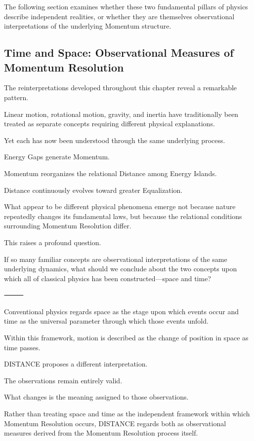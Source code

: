 The following section examines whether these two fundamental pillars of physics describe independent realities, or whether they are themselves observational interpretations of the underlying Momentum structure.

\subsection*{\textbf{Time and Space: Observational Measures of Momentum Resolution}}

The reinterpretations developed throughout this chapter reveal a remarkable pattern.

Linear motion, rotational motion, gravity, and inertia have traditionally been treated as separate concepts requiring different physical explanations.

Yet each has now been understood through the same underlying process.

Energy Gaps generate Momentum.

Momentum reorganizes the relational Distance among Energy Islands.

Distance continuously evolves toward greater Equalization.

What appear to be different physical phenomena emerge not because nature repeatedly changes its fundamental laws, but because the relational conditions surrounding Momentum Resolution differ.

This raises a profound question.

If so many familiar concepts are observational interpretations of the same underlying dynamics, what should we conclude about the two concepts upon which all of classical physics has been constructed—space and time?

⸻

Conventional physics regards space as the stage upon which events occur and time as the universal parameter through which those events unfold.

Within this framework, motion is described as the change of position in space as time passes.

DISTANCE proposes a different interpretation.

The observations remain entirely valid.

What changes is the meaning assigned to those observations.

Rather than treating space and time as the independent framework within which Momentum Resolution occurs, DISTANCE regards both as observational measures derived from the Momentum Resolution process itself.

